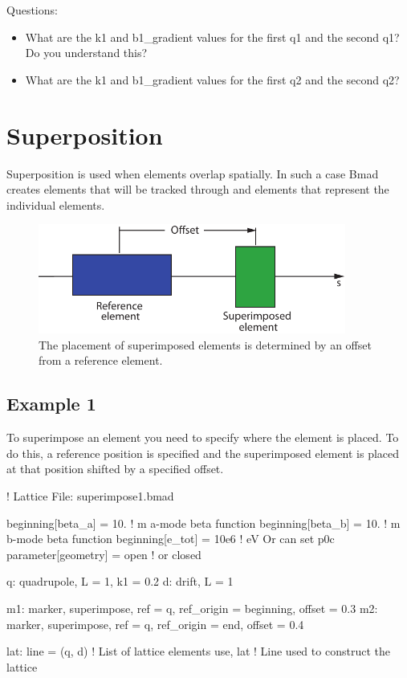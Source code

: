 \documentclass{hitec}
\newcommand{\Section}[1]{\section{#1}\vspace*{-1ex}}
\begin{document}
Questions:
\begin{itemize}
\item What are the k1 and b1_gradient values for the first q1 and the second q1? Do you understand this?
\item What are the k1 and b1_gradient values for the first q2 and the second q2?
\end{itemize}

\Section{Superposition}
\label{s:super}

Superposition is used when elements overlap spatially. In such a case Bmad creates  elements that will be tracked through
and  elements that represent the individual elements.


\begin{figure}[tb]
  \centering
  \includegraphics[width=0.9\textwidth]{superimpose.pdf}
  \caption{The placement of superimposed elements is determined by an offset from a reference element.}
  \label{f:superimpose}
\end{figure}

\subsection{Example 1}

To superimpose an element you need to specify where the element is placed. To do this, a reference position is specified
and the superimposed element is placed at that position shifted by a specified offset.

\begin{code}
! Lattice File: superimpose1.bmad

beginning[beta_a] = 10.   ! m  a-mode beta function
beginning[beta_b] = 10.   ! m  b-mode beta function
beginning[e_tot] = 10e6   ! eV   Or can set p0c
parameter[geometry] = open      ! or closed

q: quadrupole, L = 1, k1 = 0.2
d: drift, L = 1

m1: marker, superimpose, ref = q, ref_origin = beginning, offset = 0.3
m2: marker, superimpose, ref = q, ref_origin = end, offset = 0.4

lat: line = (q, d)   ! List of lattice elements
use, lat             ! Line used to construct the lattice
\end{code}
\end{document}
